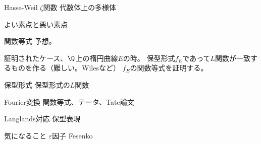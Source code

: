 \documentclass[dvipdfmx]{beamer}
\begin{document}
\begin{frame}{Hasse-Weil $\zeta$関数}
  代数体上の多様体

  よい素点と悪い素点
\end{frame}

\begin{frame}{関数等式}
  予想。

  証明されたケース、$\Q$上の楕円曲線$E$の時。
  保型形式$f_E$であって$L$関数が一致するものを作る（難しい。Wilesなど）
  $f_E$の関数等式を証明する。
\end{frame}

\begin{frame}{保型形式}
  保型形式の$L$関数
\end{frame}

\begin{frame}{Fourier変換}
  関数等式、テータ、Tate論文
\end{frame}

\begin{frame}{Langlands対応}
  保型表現
\end{frame}

\begin{frame}{気になること}
  $\varepsilon$因子
  Fesenko
\end{frame}
\end{document}
